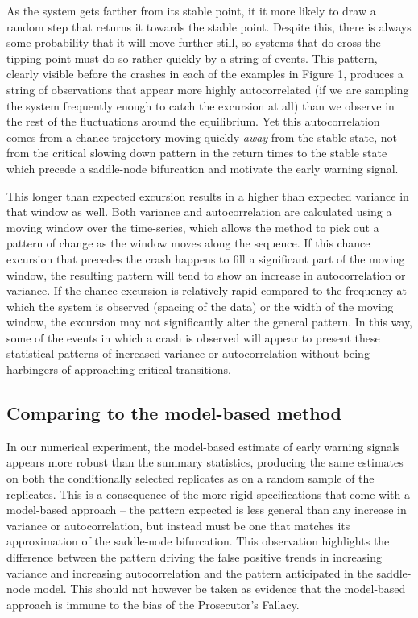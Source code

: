 As the system gets farther from its stable point, it it more likely to draw a random step that
returns it towards the stable point. Despite this, there is always some probability that
it will move further still, so systems that do cross the tipping point must do
so rather quickly by a string of events.  This pattern, clearly visible before the crashes in each of
the examples in Figure 1, produces a string of observations that appear
more highly autocorrelated (if we are sampling the system frequently
enough to catch the excursion at all) than we observe in the rest of the
fluctuations around the equilibrium.  Yet this autocorrelation comes from
a chance trajectory moving quickly \emph{away} from the stable state,
not from the critical slowing down pattern in the return times to the
stable state which precede a saddle-node bifurcation and motivate the
early warning signal.


This longer than expected excursion results in a higher than expected
variance in that window as well. Both variance and autocorrelation are
calculated using a moving window over the time-series, which allows
the method to pick out a pattern of change as the window moves along
the sequence. If this chance excursion that precedes the crash happens
to fill a significant part of the moving window, the resulting pattern
will tend to show an increase in autocorrelation or variance.  If the
chance excursion is relatively rapid compared to the frequency at which
the system is observed (spacing of the data) or the width of the moving
window, the excursion may not significantly alter the general pattern.
In this way, some of the events in which a crash is observed will
appear to present these statistical patterns of increased variance
or autocorrelation without being harbingers of approaching critical
transitions.


\subsection{Comparing to the model-based method}

In our numerical experiment, the model-based estimate of early warning signals
appears more robust than the summary statistics, producing the same
estimates on both the conditionally selected replicates as on a random
sample of the replicates.  This is a consequence of the more rigid
specifications that come with a model-based approach -- the pattern
expected is less general than any increase in variance or autocorrelation,
but instead must be one that matches its approximation of the saddle-node
bifurcation. This observation highlights the difference between the
pattern driving the false positive trends in increasing variance and
increasing autocorrelation and the pattern anticipated in the saddle-node
model. This should not however be taken as evidence that the model-based
approach is immune to the bias of the Prosecutor's Fallacy.


